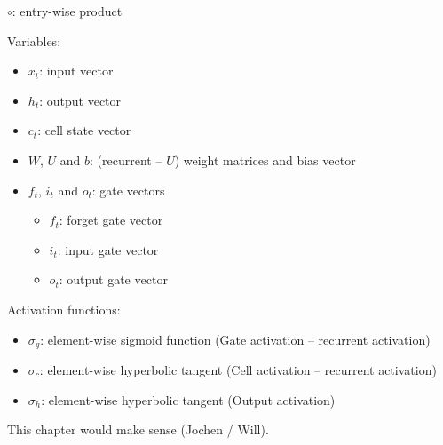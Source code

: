 $\circ$: entry-wise product


Variables:
\begin{itemize}
\item $x_t$: input vector
\item $h_t$: output vector
\item $c_t$: cell state vector
\item $W$, $U$ and $b$: (recurrent -- $U$) weight matrices and bias vector
\item $f_t$, $i_t$ and $o_t$: gate vectors
  \begin{itemize}
  \item $f_t$: forget gate vector
  \item $i_t$: input gate vector
  \item $o_t$: output gate vector
  \end{itemize}
\end{itemize}

Activation functions:
\begin{itemize}
\item $\sigma_g$: element-wise sigmoid function (Gate activation -- recurrent
  activation)
\item $\sigma_c$: element-wise hyperbolic tangent (Cell activation -- recurrent
  activation)
\item $\sigma_h$: element-wise hyperbolic tangent (Output activation)
\end{itemize}

This chapter would make sense (Jochen / Will).

